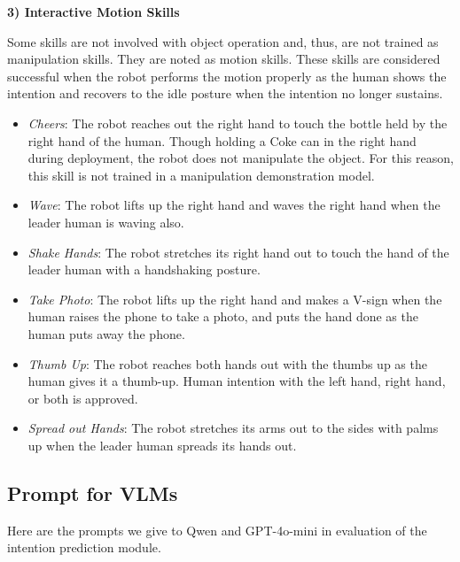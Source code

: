 \noindent\textbf{3) Interactive Motion Skills}

Some skills are not involved with object operation and, thus, are not trained as manipulation skills. 
They are noted as motion skills.
These skills are considered successful when the robot performs the motion properly as the human shows the intention and recovers to the idle posture when the intention no longer sustains.

\begin{itemize}[leftmargin=*]
\item \textit{Cheers}: The robot reaches out the right hand to touch the bottle held by the right hand of the human.
Though holding a Coke can in the right hand during deployment, the robot does not manipulate the object.
For this reason, this skill is not trained in a manipulation demonstration model.

\item \textit{Wave}: The robot lifts up the right hand and waves the right hand when the leader human is waving also.

\item \textit{Shake Hands}: The robot stretches its right hand out to touch the hand of the leader human with a handshaking posture.

\item \textit{Take Photo}: The robot lifts up the right hand and makes a V-sign when the human raises the phone to take a photo, and puts the hand done as the human puts away the phone.

\item \textit{Thumb Up}: The robot reaches both hands out with the thumbs up as the human gives it a thumb-up.
Human intention with the left hand, right hand, or both is approved.

\item \textit{Spread out Hands}: The robot stretches its arms out to the sides with palms up when the leader human spreads its hands out.
    
\end{itemize}

\subsection{Prompt for VLMs}
Here are the prompts we give to Qwen and GPT-4o-mini in evaluation of the intention prediction module.

